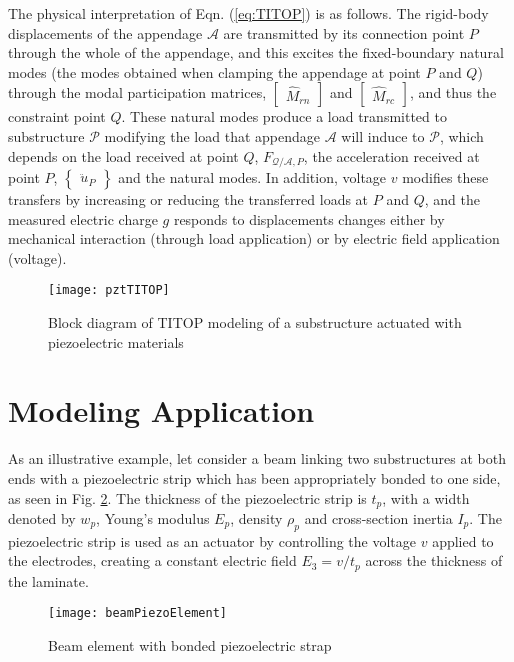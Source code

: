 \documentclass{ifacconf}
\begin{document}
The physical interpretation of Eqn. (\ref{eq:TITOP}) is as follows. The rigid-body displacements of the appendage $\mathcal{A}$ are transmitted by its connection point $P$ through the whole of the appendage, and this excites the fixed-boundary natural modes (the modes obtained when clamping the appendage at point $P$ and $Q$) through the modal participation matrices, $\begin{bmatrix} \hat{M}_{rn} \end{bmatrix}$ and $\begin{bmatrix}\hat{M}_{rc} \end{bmatrix}$, and thus the constraint point $Q$. These natural modes produce a load transmitted to substructure $\mathcal{P}$ modifying the load that appendage $\mathcal{A}$ will induce to $\mathcal{P}$, which depends on the load received at point $Q$, $F_{\mathcal{Q}/\mathcal{A},P}$, the acceleration received at point $P$, $\begin{Bmatrix} \ddot{u}_P \end{Bmatrix}$ and the natural modes. In addition, voltage $v$ modifies these transfers by increasing or reducing the transferred loads at $P$ and $Q$, and the measured electric charge $g$ responds to displacements changes either by mechanical interaction (through load application) or by electric field application (voltage).

\begin{figure} 
\center
\texttt{[image: pztTITOP]}
\caption{Block diagram of TITOP modeling of a substructure actuated with piezoelectric materials}
\label{fig:pztTITOP}
\end{figure}


\section{Modeling Application}
\label{sec:modeling}

As an illustrative example, let consider a beam linking two substructures at both ends with a piezoelectric strip which has been appropriately bonded to one side, as seen in Fig. \ref{fig:beamPiezoElement}. The thickness of the piezoelectric strip is $t_p$, with a width denoted by $w_p$, Young's modulus $E_p$, density $\rho_p$ and cross-section inertia $I_p$. The piezoelectric strip is used
as an actuator by controlling the voltage $v$ applied to the electrodes‚ creating a constant electric field $E_3 = v/t_p$ across the thickness of the laminate.

\begin{figure} 
\center
\texttt{[image: beamPiezoElement]}
\caption{Beam element with bonded piezoelectric strap }
\label{fig:beamPiezoElement}
\end{figure}
\end{document}
